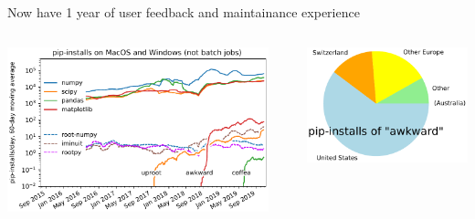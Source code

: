 \documentclass[aspectratio=169]{beamer}
\begin{document}
\begin{frame}{Now have 1 year of user feedback and maintainance experience}
\large
\vspace{0.5 cm}

\begin{columns}
\includegraphics[width=\linewidth]{pip-timeline.pdf}

\vspace{0.1 cm}
\centering \textcolor{darkblue}{}

\hfill\includegraphics[width=0.8\linewidth]{pip-country-awkward.pdf}


\end{columns}
\end{frame}
\end{document}
